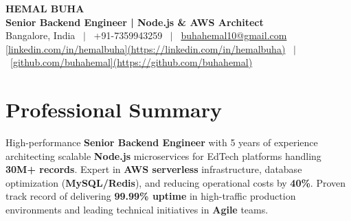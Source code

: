 \documentclass[11pt,a4paper]{article}
\begin{document}
\begin{center}
    {\Huge \textbf{HEMAL BUHA}} \\ \vspace{4pt}
    {\Large \textbf{Senior Backend Engineer | Node.js \& AWS Architect}} \\ \vspace{6pt}
    Bangalore, India \ $|$ \ +91-7359943259 \ $|$ \ \href{mailto:buhahemal10@gmail.com}{buhahemal10@gmail.com} \\ \vspace{2pt}
    \href{[https://www.linkedin.com/in/hemalbuha/](https://www.linkedin.com/in/hemalbuha/)}{[linkedin.com/in/hemalbuha](https://linkedin.com/in/hemalbuha)} \ $|$ \ \href{[https://github.com/buhahemal](https://github.com/buhahemal)}{[github.com/buhahemal](https://github.com/buhahemal)}
\end{center}

\vspace{10pt}

\section{Professional Summary}
High-performance \textbf{Senior Backend Engineer} with 5 years of experience architecting scalable \textbf{Node.js} microservices for EdTech platforms handling \textbf{30M+ records}. Expert in \textbf{AWS serverless} infrastructure, database optimization (\textbf{MySQL/Redis}), and reducing operational costs by \textbf{40\%}. Proven track record of delivering \textbf{99.99\% uptime} in high-traffic production environments and leading technical initiatives in \textbf{Agile} teams.

\end{document}
